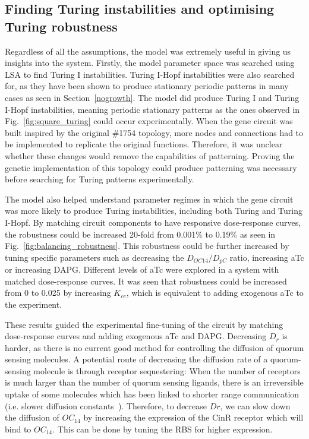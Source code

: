 \subsection{Finding Turing instabilities and optimising Turing robustness}
Regardless of all the assumptions, the model was extremely useful in giving us insights into the system.
Firstly, the model parameter space was searched using LSA to find Turing I instabilities.
Turing I-Hopf instabilities were also searched for, as they have been shown to produce stationary periodic patterns in many cases as seen in Section~\ref{nogrowth}.
The model did produce Turing I and Turing I-Hopf instabilities, meaning periodic stationary patterns as the ones observed in Fig.~\ref{fig:square_turing} could occur experimentally.
When the gene circuit was built inspired by the original \#1754 topology,
more nodes and connections had to be implemented to replicate the original functions.
Therefore, it was unclear whether these changes would remove the capabilities of patterning.
Proving the genetic implementation of this topology could produce patterning was necessary before searching for Turing patterns experimentally.

The model also helped understand parameter regimes in which the gene circuit was more likely to produce Turing instabilities, including both Turing and Turing I-Hopf.
By matching circuit components to have responsive dose-response curves, the robustness could be increased 20-fold from 0.001\% to 0.19\% as seen in Fig.~\ref{fig:balancing_robustness}.
This robustness could be further increased by tuning specific parameters such as decreasing the $D_{OC14}/D_{pC}$ ratio, increasing aTc or increasing DAPG.
Different levels of aTc were explored in a system with matched dose-response curves.
It was seen that robustness could be increased from 0 to 0.025 by increasing $K_{ce}$, which is equivalent to adding exogenous aTc to the experiment.

These results guided the experimental fine-tuning of the circuit by matching dose-response curves and adding exogenous aTc and DAPG.
Decreasing $D_{r}$ is harder, as there is no current good method for controlling the diffusion of quorum sensing molecules.
A potential route of decreasing the diffusion rate of a quorum-sensing molecule is through receptor sequestering:
When the number of receptors is much larger than the number of quorum sensing ligands,
there is an irreversible uptake of some molecules which has been linked to shorter range communication (i.e. slower diffusion constants~\parencite{vangestel}).
Therefore, to decrease $D{r}$,
we can slow down the diffusion of $OC_{14}$ by increasing the expression of the CinR receptor which will bind to $OC_{14}$.
This can be done by tuning the RBS for higher expression.

